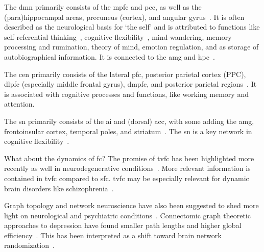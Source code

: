 The \gls{dmn} primarily consists of the \gls{mpfc} and \gls{pcc}, as well as the (para)hippocampal areas, precuneus (cortex), and angular gyrus~\parencite{Andrews-Hanna2010}.
It is often described as the neurological basis for `the self' and is attributed to functions like self-referential thinking~\parencite{Sheline2009}, cognitive flexibility~\parencite{Vatansever2016}, mind-wandering, memory processing and rumination, theory of mind, emotion regulation, and as storage of autobiographical information.
It is connected to the \gls{amg} and \gls{hpc}~\parencite{Andrews-Hanna2014}.

The \gls{cen} primarily consists of the lateral \gls{pfc}, posterior parietal cortex (PPC), \gls{dlpfc} (especially middle frontal gyrus), \gls{dmpfc}, and posterior parietal regions~\parencite{Rogers2004}.
It is associated with cognitive processes and functions, like working memory and attention.

The \gls{sn} primarily consists of the \gls{ai} and (dorsal) \gls{acc}, with some adding the \gls{amg}, frontoinsular cortex, temporal poles, and striatum~\parencite{Seeley2007, Menon2010, Beck2016}.
The \gls{sn} is a key network in cognitive flexibility~\parencite{Dajani2015}.

What about the dynamics of \gls{fc}?
The promise of \gls{tvfc} has been highlighted more recently as well in neurodegenerative conditions~\parencite{Filippi2019}.
More relevant information is contained in \gls{tvfc} compared to \gls{sfc}.
\gls{tvfc} may be especially relevant for dynamic brain disorders like schizophrenia~\parencite{Jin2017}.

Graph topology and network neuroscience have also been suggested to shed more light on neurological and psychiatric conditions~\parencite{Fornito2013}.
Connectomic graph theoretic approaches to depression have found smaller path lengths and higher global efficiency~\parencite{Zhang2011}.
This has been interpreted as a shift toward brain network randomization~\parencite{Gong2015}.
